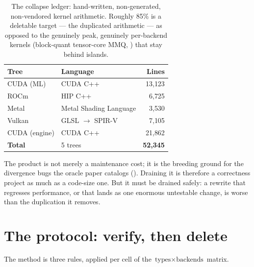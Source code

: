 \documentclass[11pt]{article}
\begin{document}
\begin{table}[h]
\centering
\begin{tabular}{llr}
\toprule
\textbf{Tree} & \textbf{Language} & \textbf{Lines} \\
\midrule
CUDA (ML)      & CUDA C++                 & 13{,}123 \\
ROCm           & HIP C++                  & 6{,}725  \\
Metal          & Metal Shading Language   & 3{,}530  \\
Vulkan         & GLSL $\rightarrow$ SPIR-V & 7{,}105  \\
CUDA (engine)  & CUDA C++                 & 21{,}862 \\
\midrule
\textbf{Total} & 5 trees & \textbf{52{,}345} \\
\bottomrule
\end{tabular}
\caption{The collapse ledger: hand-written, non-generated, non-vendored kernel arithmetic.\protect\footnotemark{}
Roughly 85\% is a deletable target --- the duplicated arithmetic --- as opposed to the genuinely peak,
genuinely per-backend kernels (block-quant tensor-core MMQ, \cite{mmq}) that stay behind islands.}
\label{tab:ledger}
\end{table}

The product is not merely a maintenance cost; it is the breeding ground for the divergence bugs the oracle
paper catalogs (\cite{oracle}). Draining it is therefore a correctness project as much as a code-size one.
But it must be drained safely: a rewrite that regresses performance, or that lands as one enormous
untestable change, is worse than the duplication it removes.

\section{The protocol: verify, then delete}
\label{sec:protocol}

The method is three rules, applied per cell of the $\text{types}\times\text{backends}$ matrix.
\end{document}
